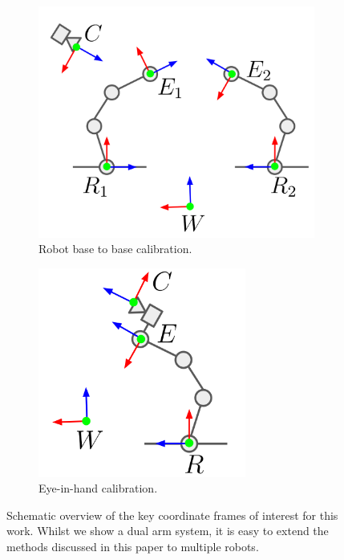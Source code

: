 \begin{figure}[t]
     \centering
     \begin{subfigure}[b]{0.45\textwidth}
         \centering
         \includegraphics[width=\textwidth]{img/base2base.png}
         \caption{Robot base to base calibration.}
         \label{c4:fig:base2base}
     \end{subfigure}
     \hfill
     \begin{subfigure}[b]{0.45\textwidth}
         \centering
         \includegraphics[width=0.75\textwidth]{img/eyeinhand.png}
         \caption{Eye-in-hand calibration.}
         \label{c4:fig:eyeinhand}
     \end{subfigure}
     
    \caption{
    Schematic overview of the key coordinate frames of interest for this work.
    Whilst we show a dual arm system, it is easy to extend the methods discussed in this paper to multiple robots.
    }
    \label{c4:fig:schematic}
\end{figure}

